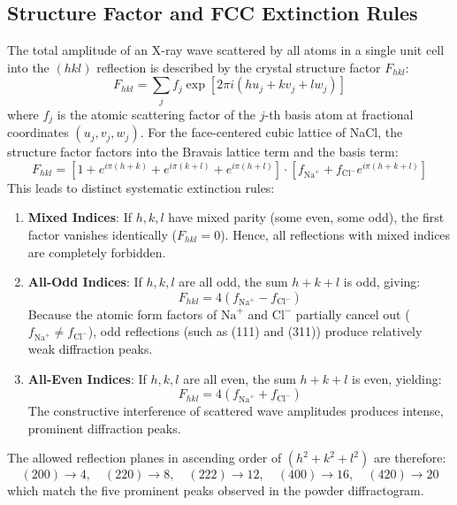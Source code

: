 \documentclass[12pt,a4paper]{article}
\begin{document}
\subsection{Structure Factor and FCC Extinction Rules}
The total amplitude of an X-ray wave scattered by all atoms in a single unit cell into the $(hkl)$ reflection is described by the crystal structure factor $F_{hkl}$:
\begin{equation}
    F_{hkl} = \sum_{j} f_j \exp\left[2\pi i (h u_j + k v_j + l w_j)\right]
\end{equation}
where $f_j$ is the atomic scattering factor of the $j$-th basis atom at fractional coordinates $(u_j, v_j, w_j)$. For the face-centered cubic lattice of NaCl, the structure factor factors into the Bravais lattice term and the basis term:
\begin{equation}
    F_{hkl} = \left[1 + e^{i\pi(h+k)} + e^{i\pi(k+l)} + e^{i\pi(h+l)}\right] \cdot \left[f_{\text{Na}^+} + f_{\text{Cl}^-} e^{i\pi(h+k+l)}\right]
\end{equation}
This leads to distinct systematic extinction rules:
\begin{enumerate}
    \item \textbf{Mixed Indices}: If $h, k, l$ have mixed parity (some even, some odd), the first factor vanishes identically ($F_{hkl} = 0$). Hence, all reflections with mixed indices are completely forbidden.
    \item \textbf{All-Odd Indices}: If $h, k, l$ are all odd, the sum $h+k+l$ is odd, giving:
    \begin{equation}
        F_{hkl} = 4(f_{\text{Na}^+} - f_{\text{Cl}^-})
    \end{equation}
    Because the atomic form factors of $\text{Na}^+$ and $\text{Cl}^-$ partially cancel out ($f_{\text{Na}^+} \neq f_{\text{Cl}^-}$), odd reflections (such as (111) and (311)) produce relatively weak diffraction peaks.
    \item \textbf{All-Even Indices}: If $h, k, l$ are all even, the sum $h+k+l$ is even, yielding:
    \begin{equation}
        F_{hkl} = 4(f_{\text{Na}^+} + f_{\text{Cl}^-})
    \end{equation}
    The constructive interference of scattered wave amplitudes produces intense, prominent diffraction peaks.
\end{enumerate}
The allowed reflection planes in ascending order of $(h^2 + k^2 + l^2)$ are therefore:
\begin{equation}
    (200) \to 4, \quad (220) \to 8, \quad (222) \to 12, \quad (400) \to 16, \quad (420) \to 20
\end{equation}
which match the five prominent peaks observed in the powder diffractogram.
\end{document}
